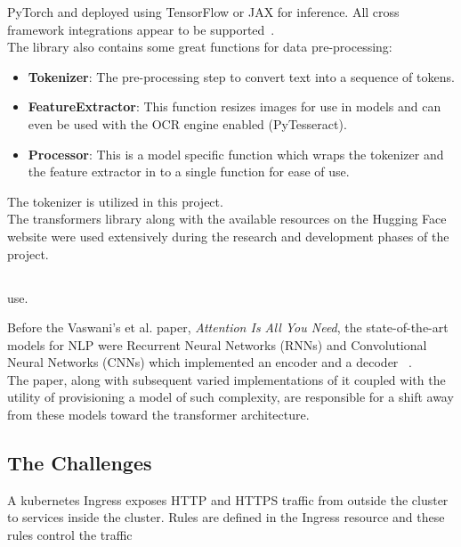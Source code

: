 PyTorch and deployed using TensorFlow or JAX for inference. All cross framework integrations appear to be supported~\autocite{Transformers}.\\
The library also contains some great functions for data pre-processing:
\begin{itemize}
	\item \textbf{Tokenizer}: The pre-processing step to convert text into a sequence of tokens.
	\item \textbf{FeatureExtractor}: This function resizes images for use in models and can even be used with the OCR engine enabled (PyTesseract).
	\item \textbf{Processor}: This is a model specific function which wraps the tokenizer and the feature extractor in to a single function for 
	ease of use.
\end{itemize}
The tokenizer is utilized in this project. \\
The transformers library along with the available resources on the Hugging Face website were used extensively during the research and development
phases of the project.
\subsection{}
use.


Before the Vaswani's et al. paper, \emph{Attention Is All You Need}, the state-of-the-art models for NLP were Recurrent Neural Networks
(RNNs) and Convolutional Neural Networks (CNNs) which implemented an encoder and a decoder
~\autocite{brownleeEncoderDecoderRecurrentNeural2017}. \\
The paper, along with subsequent varied implementations of it coupled with the utility of provisioning a model of such complexity, 
are responsible for a shift away from these models toward the transformer architecture.

\subsection{The Challenges}
\label{sec:challenges}
A kubernetes Ingress exposes HTTP and HTTPS traffic
from outside the cluster to services inside the cluster. Rules are defined in the Ingress resource and these rules control the
traffic
